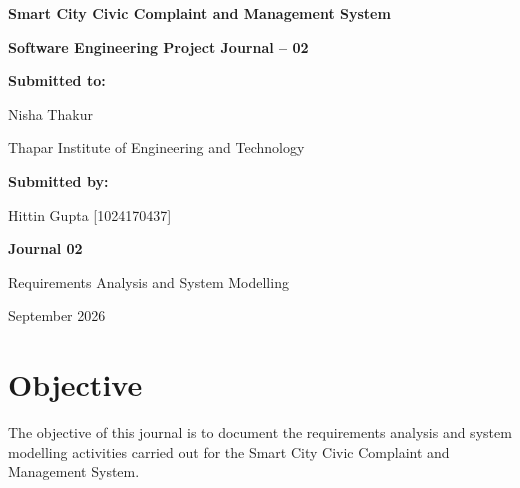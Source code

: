 \documentclass[12pt,a4paper]{article}
\begin{document}

\begin{titlepage}

\centering

\vspace*{0.8in}

{\Large\bfseries Smart City Civic Complaint and Management System\par}

\vspace{0.25in}

{\large\bfseries Software Engineering Project Journal -- 02\par}

\vspace{0.8in}

\textbf{Submitted to:}\par

Nisha Thakur\par

Thapar Institute of Engineering and Technology\par

\vspace{0.45in}

\textbf{Submitted by:}\par

Hittin Gupta [1024170437]\par

\vfill

\textbf{Journal 02}\par

Requirements Analysis and System Modelling\par

September 2026

\end{titlepage}


\section{Objective}

The objective of this journal is to document the requirements analysis and system modelling activities carried out for the Smart City Civic Complaint and Management System.
\end{document}
